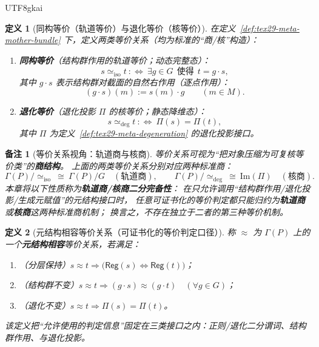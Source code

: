 \documentclass[12pt]{article}
\newtheorem{definition}{定义}[section]
\newtheorem{remark}{备注}[section]
\begin{document}
\begin{CJK*}{UTF8}{gkai}
\begin{definition}[同构等价（轨道等价）与退化等价（核等价）]
\label{def:tex29-meta-equivalences}
在定义~\ref{def:tex29-meta-mother-bundle} 下，定义两类等价关系（均为标准的“商/核”构造）：
\begin{enumerate}
  \item \textbf{同构等价}（结构群作用的轨道等价；动态完整态）：
  \[
    s\simeq_{\mathrm{iso}} t\ :\Longleftrightarrow\ \exists g\in G\ \ \text{使得}\ \ t=g\cdot s,
  \]
  其中 $g\cdot s$ 表示结构群对截面的自然右作用（逐点作用）：
  \[
    (g\cdot s)(m):=s(m)\cdot g\qquad(m\in M).
  \]
  \item \textbf{退化等价}（退化投影 $\Pi$ 的核等价；静态降维态）：
  \[
    s\simeq_{\mathrm{deg}} t\ :\Longleftrightarrow\ \Pi(s)=\Pi(t),
  \]
  其中 $\Pi$ 为定义~\ref{def:tex29-meta-degeneration} 的退化投影接口。
\end{enumerate}
\end{definition}

\begin{remark}[等价关系视角：轨道商与核商]
等价关系可视为“把对象压缩为可复核等价类”的\textbf{商结构}。
上面的两类等价关系分别对应两种标准商：
\[
  \Gamma(P)\big/\simeq_{\mathrm{iso}}\ \cong\ \Gamma(P)/G\quad(\text{轨道商}),
  \qquad
  \Gamma(P)\big/\simeq_{\mathrm{deg}}\ \cong\ \mathrm{Im}(\Pi)\quad(\text{核商}).
\]
本章将以下性质称为\textbf{轨道商/核商二分完备性}：
在只允许调用“结构群作用/退化投影/生成元赋值”的元结构接口时，
任意可证书化的等价判定都只能归约为\textbf{轨道商}或\textbf{核商}这两种标准商机制；
换言之，不存在独立于二者的第三种等价机制。
\end{remark}

\begin{definition}[元结构相容等价关系（可证书化的等价判定口径）]
\label{def:tex29-meta-compatible-equivalence}
称 $\approx$ 为 $\Gamma(P)$ 上的一个\textbf{元结构相容}等价关系，若满足：
\begin{enumerate}
  \item （分层保持）$s\approx t\Rightarrow \bigl(\mathsf{Reg}(s)\Leftrightarrow \mathsf{Reg}(t)\bigr)$；
  \item （结构群不变）$s\approx t\Rightarrow (g\cdot s)\approx(g\cdot t)\quad(\forall g\in G)$；
  \item （退化不变）$s\approx t\Rightarrow \Pi(s)=\Pi(t)$。
\end{enumerate}
该定义把“允许使用的判定信息”固定在三类接口之内：正则/退化二分谓词、结构群作用、与退化投影。
\end{definition}


\end{CJK*}
\end{document}
